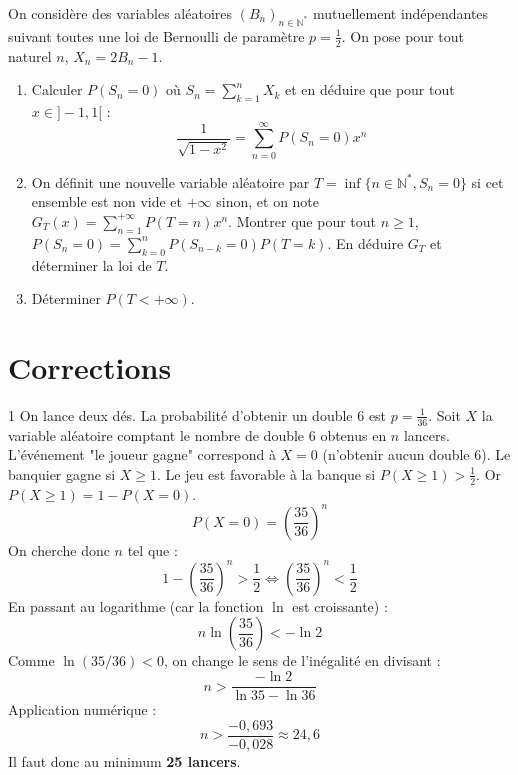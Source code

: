 \begin{exercice}
On considère des variables aléatoires $(B_{n})_{n\in\mathbb{N}^{*}}$ mutuellement indépendantes suivant toutes une loi de Bernoulli de paramètre $p=\frac{1}{2}$. On pose pour tout naturel $n$, $X_{n}=2B_{n}-1$.
\begin{enumerate}
    \item Calculer $P(S_{n}=0)$ où $S_{n}=\sum_{k=1}^{n}X_{k}$ et en déduire que pour tout $x\in]-1,1[$ :
    $$ \frac{1}{\sqrt{1-x^{2}}}=\sum_{n=0}^{\infty}P(S_{n}=0)x^{n} $$
    \item On définit une nouvelle variable aléatoire par $T=\inf\{n\in\mathbb{N}^{*},S_{n}=0\}$ si cet ensemble est non vide et $+\infty$ sinon, et on note $G_{T}(x)=\sum_{n=1}^{+\infty}P(T=n)x^{n}.$
    Montrer que pour tout $n\ge1$, $P(S_{n}=0)=\sum_{k=0}^{n}P(S_{n-k}=0)P(T=k)$.
    En déduire $G_{T}$ et déterminer la loi de $T$.
    \item Déterminer $P(T<+\infty)$.
\end{enumerate}
\end{exercice}

\section{Corrections}
\begin{correction}{1}
On lance deux dés. La probabilité d'obtenir un double 6 est $p = \frac{1}{36}$.
Soit $X$ la variable aléatoire comptant le nombre de double 6 obtenus en $n$ lancers.
L'événement "le joueur gagne" correspond à $X=0$ (n'obtenir aucun double 6). Le banquier gagne si $X \ge 1$.
Le jeu est favorable à la banque si $P(X \ge 1) > \frac{1}{2}$.
Or $P(X \ge 1) = 1 - P(X=0)$.
$$ P(X=0) = \left( \frac{35}{36} \right)^n $$
On cherche donc $n$ tel que :
$$ 1 - \left( \frac{35}{36} \right)^n > \frac{1}{2} \iff \left( \frac{35}{36} \right)^n < \frac{1}{2} $$
En passant au logarithme (car la fonction $\ln$ est croissante) :
$$ n \ln\left( \frac{35}{36} \right) < -\ln 2 $$
Comme $\ln(35/36) < 0$, on change le sens de l'inégalité en divisant :
$$ n > \frac{-\ln 2}{\ln 35 - \ln 36} $$
Application numérique :
$$ n > \frac{-0,693}{-0,028} \approx 24,6 $$
Il faut donc au minimum \textbf{25 lancers}.
\end{correction}

